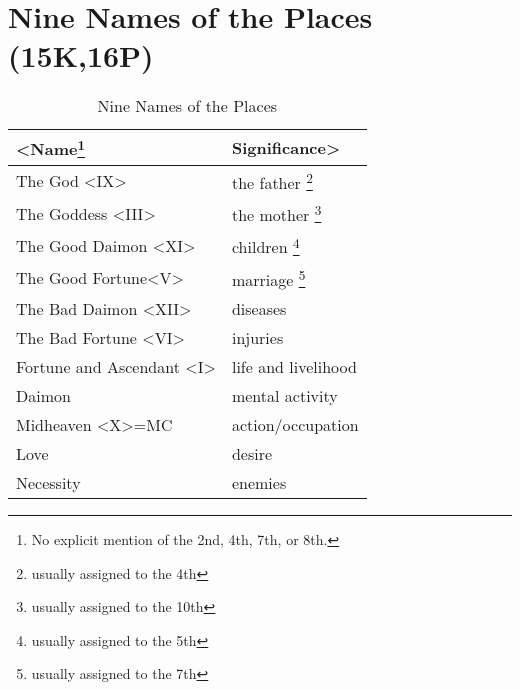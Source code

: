 \section{Nine Names of the Places (15K,16P)}
\begin{table}[ht]
\begin{center}
\caption{Nine Names of the Places}
\label{Table 2.1}
\vspace{0.5cm}
\begin{tabular}{ll}
\hline
\textbf{<Name}\footnote{No explicit mention of the 2nd, 4th, 7th, or 8th.}
			& \textbf{Significance>}	\\
\hline
The God <IX> 			& the father
						\footnote{usually assigned to the 4th}		\\
The Goddess <III>		& the mother
						\footnote{usually assigned to the 10th}	\\
The Good Daimon <XI>	& children
						\footnote{usually assigned to the 5th}		\\
The Good Fortune<V>	& marriage
						\footnote{usually assigned to the 7th}		\\
The Bad Daimon <XII>	& diseases			\\
The Bad Fortune <VI>	& injuries			\\
\parbox{4.5cm}{
Fortune and Ascendant 
<I>}						& life and livelihood	\\
Daimon							& mental activity		\\
Midheaven <X>=MC		& action/occupation		\\
Love							& desire					\\
Necessity						& enemies					\\
\hline
\end{tabular}
\end{center}
\end{table}

\newpage